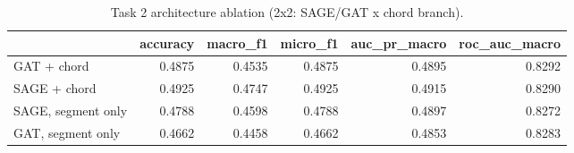 \begin{table}[t]
\caption{Task 2 architecture ablation (2x2: SAGE/GAT x chord branch).}
\label{tab:t2abl}
\begin{tabular}{lrrrrr}
\toprule
 & accuracy & macro\_f1 & micro\_f1 & auc\_pr\_macro & roc\_auc\_macro \\
\midrule
GAT + chord & 0.4875 & 0.4535 & 0.4875 & 0.4895 & 0.8292 \\
SAGE + chord & 0.4925 & 0.4747 & 0.4925 & 0.4915 & 0.8290 \\
SAGE, segment only & 0.4788 & 0.4598 & 0.4788 & 0.4897 & 0.8272 \\
GAT, segment only & 0.4662 & 0.4458 & 0.4662 & 0.4853 & 0.8283 \\
\bottomrule
\end{tabular}
\end{table}
